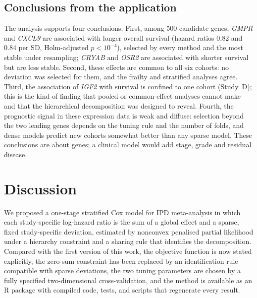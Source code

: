 \documentclass[11pt]{article}
\theoremstyle{remark}
\numberwithin{equation}{section}
\begin{document}
\subsection{Conclusions from the application}
The analysis supports four conclusions. First, among 500 candidate
genes, \textit{GMPR} and \textit{CXCL9} are associated with longer overall survival
(hazard ratios 0.82 and 0.84 per SD, Holm-adjusted $p<10^{-4}$), selected by every
method and the most stable under resampling; \textit{CRYAB} and \textit{OSR2} are
associated with shorter survival but are less stable. Second, these effects are
common to all six cohorts: no deviation was selected for them, and the frailty and
stratified analyses agree. Third, the association of \textit{IGF2} with survival is
confined to one cohort (Study~D); this is the kind of finding that pooled or
common-effect analyses cannot make and that the hierarchical decomposition was
designed to reveal. Fourth, the prognostic signal in these expression data is weak
and diffuse: selection beyond the two leading genes depends on the tuning rule and
the number of folds, and dense models predict new cohorts somewhat better than any
sparse model. These conclusions are about genes; a clinical model would add stage,
grade and residual disease.

\section{Discussion}
\label{sec:concl}
We proposed a one-stage stratified Cox model for IPD meta-analysis in which each
study-specific log-hazard ratio is the sum of a global effect and a sparse,
fixed study-specific deviation, estimated by nonconvex penalised partial
likelihood under a hierarchy constraint and a sharing rule that identifies the
decomposition. Compared with the first version of this work, the objective
function is now stated explicitly, the zero-sum constraint has been replaced by an
identification rule compatible with sparse deviations, the two tuning parameters
are chosen by a fully specified two-dimensional cross-validation, and the method is
available as an R package with compiled code, tests, and scripts that regenerate
every result.
\end{document}
